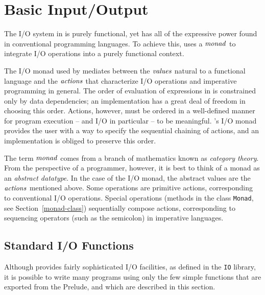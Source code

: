

\chapter{Basic Input/Output}
\label{io}

The I/O system in \Haskell{} is purely functional, yet has all of the
expressive power found in conventional programming languages.  To
achieve this, \Haskell{} uses a \mbox{$\it monad$} to integrate I/O operations into
a purely functional context.

The I/O monad used by \Haskell{} mediates between the \mbox{$\it values$} natural to
a functional language and the \mbox{$\it actions$} that characterize I/O
operations and imperative programming in general.  The order of
evaluation of expressions in \Haskell{} is constrained only by data
dependencies; an implementation has a great deal of freedom
in choosing this order.  Actions, however, must be ordered in a
well-defined manner for program execution -- and I/O in particular --
to be meaningful.  \Haskell{}'s I/O monad provides the user with a way to
specify the sequential chaining of actions, and an implementation is
obliged to preserve this order.

The term \mbox{$\it monad$} comes from a branch of mathematics known as {\em
category theory}.  From the perspective of a \Haskell{} programmer,
however, it is best to think of a monad as an {\em abstract datatype}.
In the case of the I/O monad, the abstract values are the \mbox{$\it actions$}
mentioned above.  Some operations are primitive actions,
corresponding to conventional I/O operations.  Special operations
(methods in the class \mbox{\tt Monad}, see Section~\ref{monad-class})
sequentially compose actions,
corresponding to sequencing operators (such as the semicolon) in imperative
languages.

\section{Standard I/O Functions}
\label{standard-io-functions}
Although \Haskell{} provides fairly sophisticated I/O facilities, as
defined in the \mbox{\tt IO} library, it is possible to write many
\Haskell{} programs using only the few simple functions that are
exported from the Prelude, and which are described in this section.

